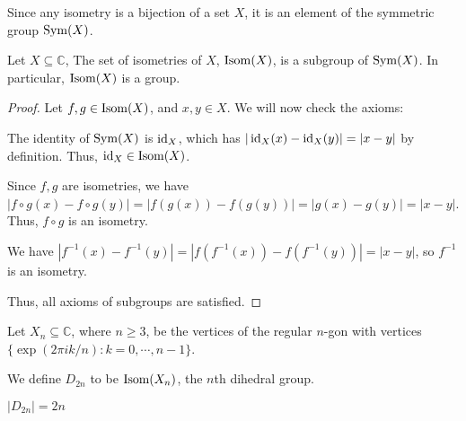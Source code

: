 \documentclass[12pt]{article}
\begin{document}
Since any isometry is a bijection of a set $X$,
it is an element of the symmetric group $\operatorname{Sym}(X)$.

\begin{prop}
    Let $X \subseteq \mathbb{C}$, The set of isometries of $X$,
    $\operatorname{Isom}(X)$, is a subgroup of $\operatorname{Sym}(X)$.
    In particular, $\operatorname{Isom}(X)$ is a group.
\end{prop}
\begin{proof}
    Let $f,g \in \operatorname{Isom}(X)$, and $x,y \in X$. 
    We will now check the axioms:
    \begin{compactenum}
    \item The identity of $\operatorname{Sym}(X)$ is $\operatorname{id}_{X}$, 
        which has $|\operatorname{id}_{X}(x) - \operatorname{id}_{X}(y)| = |x - y|$ by definition.
        Thus, $\operatorname{id}_{X} \in \operatorname{Isom}(X)$.
    \item Since $f,g$ are isometries, we have
        $|f \circ g(x) - f\circ g(y)| = |f(g(x)) - f(g(y))| = |g(x) - g(y)| = |x - y|$.
        Thus, $f\circ g$ is an isometry.
    \item We have
        $|f^{-1}(x) - f^{-1}(y)| = |f(f^{-1}(x)) - f(f^{-1}(y))| = |x - y|$,
        so $f^{-1}$ is an isometry.
    \end{compactenum}
    Thus, all axioms of subgroups are satisfied.
\end{proof}

\begin{definition}
    Let $X_n\subseteq \mathbb{C}$, where $n \ge 3$, be the vertices of the
    regular $n$-gon with vertices $\{\exp(2\pi i k / n) : k = 0,\cdots,n-1\}$.
    \begin{center}
    \end{center}
    We define $D_{2n}$ to be $\operatorname{Isom}(X_n)$, the $n$th dihedral group.
\end{definition}

\begin{theorem}
    $|D_{2n}| = 2n$
\end{theorem}
\end{document}
